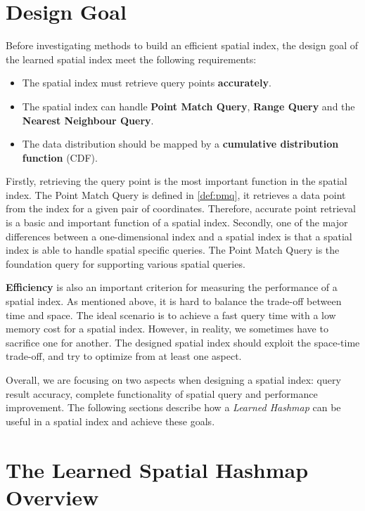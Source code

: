 \section{Design Goal}

Before investigating methods to build an efficient spatial index, the design goal of the learned spatial index meet the following requirements:
\begin{itemize}
    \item The spatial index must retrieve query points \textbf{accurately}. 
    \item The spatial index can handle \textbf{Point Match Query}, \textbf{Range Query} and the \textbf{Nearest Neighbour Query}.
    \item The data distribution should be mapped by a \textbf{cumulative distribution function} (CDF). 
\end{itemize}


Firstly, retrieving the query point is the most important function in the spatial index. The Point Match Query is defined in \ref{def:pmq}, it retrieves a data point from the index for a given pair of coordinates. Therefore, accurate point retrieval is a basic and important function of a spatial index. Secondly, one of the major differences between a one-dimensional index and a spatial index is that a spatial index is able to handle spatial specific queries. The Point Match Query is the foundation query for supporting various spatial queries.


\textbf{Efficiency} is also an important criterion for measuring the performance of a spatial index. As mentioned above, it is hard to balance the trade-off between time and space. The ideal scenario is to achieve a fast query time with a low memory cost for a spatial index. However, in reality, we sometimes have to sacrifice one for another. The designed spatial index should exploit the space-time trade-off, and try to optimize from at least one aspect. 

Overall, we are focusing on two aspects when designing a spatial index: query result accuracy, complete functionality of spatial query and performance improvement. The following sections describe how a \textit{Learned Hashmap} can be useful in a spatial index and achieve these goals. 


\section{The Learned Spatial Hashmap Overview}

